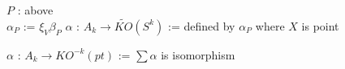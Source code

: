 \documentclass[dvipdfmx]{jsarticle}
\begin{document}
\begin{Definition}
\itemdefi
  \For \(P\) : above \\
  \Define \(\alpha_{P}\) := \(\xi_{V} \beta_{P}\)
\itemdefi
  \Define \(\alpha\) : \(A_{k} \to \tilde{KO}(S^k)\) := defined by \(\alpha_{P}\) where \(X\) is point
\end{Definition}

\begin{Theorem}
\itemprop
  \Then \(\alpha\) : \(A_{k} \to KO^{-k}(pt)\) := \(\sum \alpha\) is isomorphism
\end{Theorem}
\end{document}
